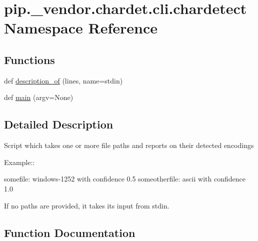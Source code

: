 \hypertarget{namespacepip_1_1__vendor_1_1chardet_1_1cli_1_1chardetect}{}\section{pip.\+\_\+vendor.\+chardet.\+cli.\+chardetect Namespace Reference}
\label{namespacepip_1_1__vendor_1_1chardet_1_1cli_1_1chardetect}
\subsection*{Functions}
\begin{DoxyCompactItemize}
\item 
def \hyperlink{namespacepip_1_1__vendor_1_1chardet_1_1cli_1_1chardetect_a970cd8c5964571647e9aed945fb91361}{description\+\_\+of} (lines, name=\textquotesingle{}stdin\textquotesingle{})
\item 
def \hyperlink{namespacepip_1_1__vendor_1_1chardet_1_1cli_1_1chardetect_af87d264701f991d8bc4bd35121273285}{main} (argv=None)
\end{DoxyCompactItemize}


\subsection{Detailed Description}
\begin{DoxyVerb}Script which takes one or more file paths and reports on their detected
encodings

Example::

    somefile: windows-1252 with confidence 0.5
    someotherfile: ascii with confidence 1.0

If no paths are provided, it takes its input from stdin.\end{DoxyVerb}
 

\subsection{Function Documentation}
\mbox{\label{namespacepip_1_1__vendor_1_1chardet_1_1cli_1_1chardetect_a970cd8c5964571647e9aed945fb91361}} 
